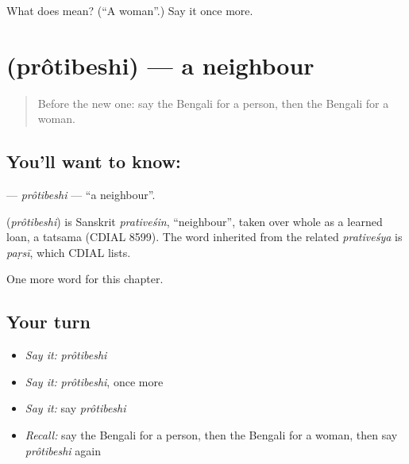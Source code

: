 \begin{tcolorbox}[breakable,colback=teal!4,colframe=teal!35!black,title={Before you move on}]
What does  mean? (\textquotedblleft{}A woman\textquotedblright{}.) Say it once more.
\end{tcolorbox}
\section[\texorpdfstring{\bn{প্রতিবেশী} (prôtibeshi)}{প্রতিবেশী (prôtibeshi)}]{ (prôtibeshi) — a neighbour}

\label{lesson:BN-C48-protibeshi}



\begin{quote}
Before the new one: say the Bengali for a person, then the Bengali for a woman.
\end{quote}

\subsection*{You'll want to know: }
\textbf{} — \emph{prôtibeshi} — \textquotedblleft{}a neighbour\textquotedblright{}.

\begin{cousinweb}
\textbf{} (\emph{prôtibeshi}) is Sanskrit \emph{prativeśin}, \textquotedblleft{}neighbour\textquotedblright{}, taken over whole as a learned loan, a tatsama (CDIAL 8599). The word inherited from the related \emph{prativeśya} is \emph{paṛsī}, which CDIAL lists.
\end{cousinweb}

\begin{grammarlens}[title={What you've built}]
One more word for this chapter.
\end{grammarlens}

\subsection*{Your turn}
\begin{itemize}
\raggedright
  \item \emph{Say it:} \emph{prôtibeshi}
  \item \emph{Say it:} \emph{prôtibeshi}, once more
  \item \emph{Say it:} say \emph{prôtibeshi}
  \item \emph{Recall:} say the Bengali for a person, then the Bengali for a woman, then say \emph{prôtibeshi} again
\end{itemize}

